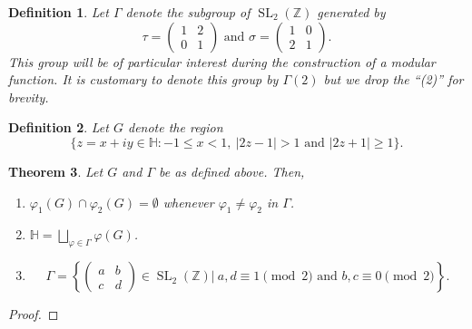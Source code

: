 \documentclass[12pt]{article}
\theoremstyle{thmstyle}
\newtheorem{theorem}{Theorem}[section]
\theoremstyle{defstyle}
\newtheorem{definition}[theorem]{Definition}
\newcommand{\Z}{\mathbb{Z}}
\newcommand{\SL}{\operatorname{SL}}
\newcommand{\bbH}{\mathbb H}
\renewcommand{\le}{\leqslant}
\renewcommand{\ge}{\geqslant}
\begin{document}
\begin{definition}
    Let $\Gamma$ denote the subgroup of $\SL_2(\Z)$ generated by 
    \begin{equation*}
        \tau = 
        \begin{pmatrix}
            1 & 2\\
            0 & 1
        \end{pmatrix}
        \text{ and }
        \sigma = 
        \begin{pmatrix}
            1 & 0\\
            2 & 1
        \end{pmatrix}.
    \end{equation*}
    This group will be of particular interest during the construction of a modular function. It is customary to denote this group by $\Gamma(2)$ but we drop the ``(2)'' for brevity.
\end{definition}

\begin{definition}
    Let $G$ denote the region 
    \begin{equation*}
        \{z = x + iy \in\bbH\colon -1\le x < 1,~|2z - 1| > 1\text{ and }|2z + 1|\ge 1\}.
    \end{equation*}
\end{definition}

\begin{theorem}
    Let $G$ and $\Gamma$ be as defined above. Then, 
    \begin{enumerate}
        \item $\varphi_1(G)\cap\varphi_2(G) = \emptyset$ whenever $\varphi_1\ne\varphi_2$ in $\Gamma$.
        \item $\bbH = \bigsqcup_{\varphi\in\Gamma}\varphi(G)$.
        \item   
        \begin{equation*}
            \Gamma = \left\{
            \begin{pmatrix}
                a & b\\
                c & d
            \end{pmatrix}\in\SL_2(\Z)
            \Bigg\vert~a,d\equiv1\pmod 2\text{ and } b,c\equiv0\pmod 2
            \right\}.
        \end{equation*}
    \end{enumerate}
\end{theorem}
\begin{proof}
    
\end{proof}
\end{document}
